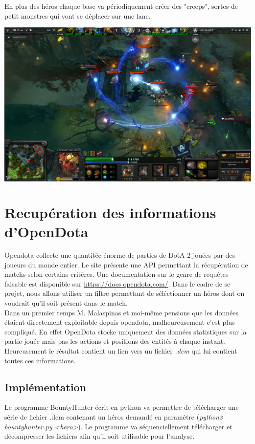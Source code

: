 \documentclass{article}
\begin{document}
En plus des héros chaque base va périodiquement créer des "creeps", sortes de petit monstres qui vont se déplacer sur une lane.

\includegraphics[scale=0.3]{"dota2screen.png"} 

\section{Recupération des informations d'OpenDota}

Opendota collecte une quantitée énorme de parties de DotA 2 jouées par des joueurs du monde entier. Le site présente une API permettant la récupération de matchs selon certains critères. Une documentation sur le genre de requêtes faisable est disponible sur \url{https://docs.opendota.com/}. Dans le cadre de se projet, nous allons utiliser un filtre permettant de séléctionner un héros dont on voudrait qu'il soit présent dans le match.\\
Dans un premier temps M. Malaspinas et moi-même pensions que les données étaient directement exploitable depuis opendota, malheureusement c'est plus compliqué. En effet OpenDota stocke uniquement des données statistiques sur la partie jouée mais pas les actions et positions des entités à chaque instant. Heureusement le résultat contient un lien vers un fichier \textit{.dem} qui lui contient toutes ces informations.

\subsection{Implémentation}

Le programme BountyHunter écrit en python va permettre de télécharger une série de fichier .dem contenant un héros demandé en paramètre (\textit{python3 bountyhunter.py <hero>}). Le programme va séquenciellement télécharger et décompresser les fichiers afin qu'il soit utilisable pour l'analyse.
\end{document}
